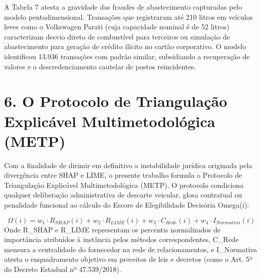\documentclass[10pt,a4paper,journal]{article}
\begin{document}
A Tabela 7 atesta a gravidade das fraudes de abastecimento capturadas pelo modelo pentadimensional. Transações que registraram até 210 litros em veículos leves como o Volkswagen Parati (cuja capacidade nominal é de 52 litros) caracterizam desvio direto de combustível para terceiros ou simulação de abastecimento para geração de crédito ilícito no cartão corporativo. O modelo identificou 13.936 transações com padrão similar, subsidiando a recuperação de valores e o descredenciamento cautelar de postos reincidentes.

\section{6. O Protocolo de Triangulação Explicável Multimetodológica (METP)}
Com a finalidade de dirimir em definitivo a instabilidade jurídica originada pela divergência entre SHAP e LIME, o presente trabalho formula o Protocolo de Triangulação Explicável Multimetodológica (METP). O protocolo condiciona qualquer deliberação administrativa de descarte veicular, glosa contratual ou penalidade funcional ao cálculo do Escore de Elegibilidade Decisória Omega(i):

\begin{equation}
\Omega(i) = w_{1} \cdot R_{SHAP}(i) + w_{2} \cdot R_{LIME}(i) + w_{3} \cdot C_{Rede}(i) + w_{4} \cdot I_{Normativa}(i) \label{eq:9}
\end{equation}
Onde R\_SHAP e R\_LIME representam os percentis normalizados de importância atribuídos à instância pelos métodos correspondentes, C\_Rede mensura a centralidade do fornecedor na rede de relacionamentos, e I\_Normativa atesta o enquadramento objetivo em preceitos de leis e decretos (como o Art. 5º do Decreto Estadual nº 47.539/2018).
\end{document}

